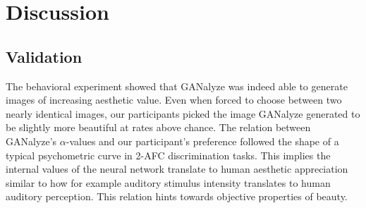 \documentclass[../main.tex]{subfiles}
\begin{document}
\section{Discussion}

\subsection{Validation}

The behavioral experiment showed that GANalyze was indeed able to generate images of increasing aesthetic value. Even when forced to choose between two nearly identical images, our participants picked the image GANalyze generated to be slightly more beautiful at rates above chance. The relation between GANalyze's $\alpha$-values and our participant's preference followed the shape of a typical psychometric curve in 2-AFC discrimination tasks. This implies the internal values of the neural network translate to human aesthetic appreciation similar to how for example auditory stimulus intensity translates to human auditory perception. This relation hints towards objective properties of beauty.





\end{document}
